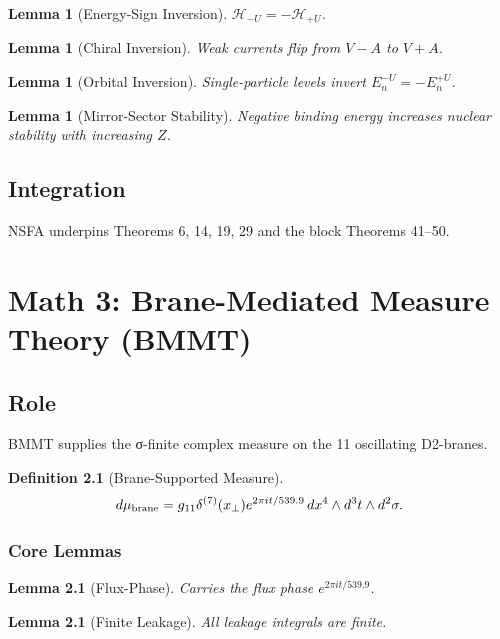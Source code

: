 \documentclass[11pt,a4paper]{book}
\newtheorem{lemma}[theorem]{Lemma}
\newtheorem{definition}[theorem]{Definition}
\theoremstyle{remark}
\theoremstyle{definition}
\begin{document}
\begin{lemma}[Energy-Sign Inversion]
\(\mathcal{H}_{-U} = -\mathcal{H}_{+U}\).
\end{lemma}

\begin{lemma}[Chiral Inversion]
Weak currents flip from \(V-A\) to \(V+A\).
\end{lemma}

\begin{lemma}[Orbital Inversion]
Single-particle levels invert \(E_n^{-U} = -E_n^{+U}\).
\end{lemma}

\begin{lemma}[Mirror-Sector Stability]
Negative binding energy increases nuclear stability with increasing \(Z\).
\end{lemma}

\section{Integration}

NSFA underpins Theorems 6, 14, 19, 29 and the block Theorems 41–50.

\chapter{Math 3: Brane-Mediated Measure Theory (BMMT)}

\section{Role}

BMMT supplies the σ-finite complex measure on the 11 oscillating D2-branes.

\begin{definition}[Brane-Supported Measure]
\[ d\mu_{\rm brane} = g_{11} \delta^{(7)}(x_\perp) e^{2\pi i t / 539.9} \, dx^4 \wedge d^3 t \wedge d^2 \sigma. \]
\end{definition}

\subsection{Core Lemmas}

\begin{lemma}[Flux-Phase]
Carries the flux phase \(e^{2\pi i t / 539.9}\).
\end{lemma}

\begin{lemma}[Finite Leakage]
All leakage integrals are finite.
\end{lemma}
\end{document}
